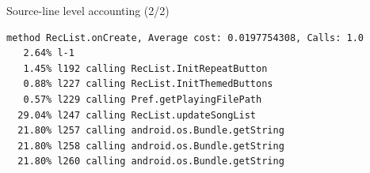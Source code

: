 %
%
\begin{frame}[fragile]{Source-line level accounting (2/2)}
\centering
{\tiny%
\begin{lstlisting}
method RecList.onCreate, Average cost: 0.0197754308, Calls: 1.0
   2.64% l-1
   1.45% l192 calling RecList.InitRepeatButton
   0.88% l227 calling RecList.InitThemedButtons
   0.57% l229 calling Pref.getPlayingFilePath
  29.04% l247 calling RecList.updateSongList
  21.80% l257 calling android.os.Bundle.getString
  21.80% l258 calling android.os.Bundle.getString
  21.80% l260 calling android.os.Bundle.getString
\end{lstlisting}}
\end{frame}
%
%
